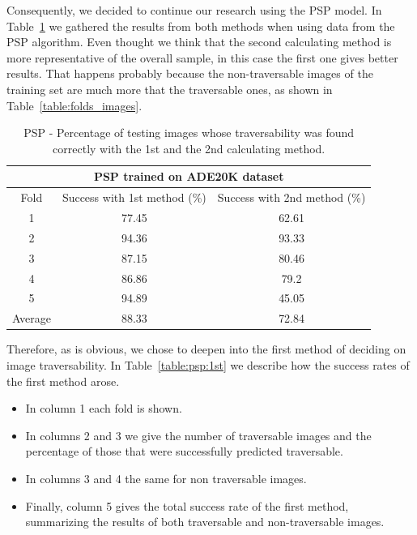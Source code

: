 \documentclass[12pt,a4paper,table,dvipsnames,tikz]{report}
\newcommand{\acronym}{\MakeUppercase}
\newcommand{\bl}[1]{{\hypersetup{linkcolor=blue}#1}}
\begin{document}
	Consequently, we decided to continue our research using the \acronym{psp} model. 
	In Table~\bl{\ref{table:psp}} we gathered the results from both methods when using data 
	from the \acronym{psp} algorithm. Even thought we think that the second calculating 
	method is more representative of the overall sample, in this case the first one gives 
	better results. That happens probably because the non-traversable images of the 
	training set are much more that the traversable ones, as shown in 
	Table~\bl{\ref{table:folds_images}}.
	\\
	
	\begin{table}[h!]
		\caption{\acronym{psp} - Percentage of testing images whose	traversability 
			was found correctly with the 1st and the 2nd calculating method.}
		\centering
		\begin{tabular}{|c|c|c|}
			\hline
			\multicolumn{3}{|c|}{\acronym{psp} trained on \acronym{ade20k} dataset}\\
			\hline
			Fold & Success with 1st method (\%) & Success with 2nd method (\%)\\ 
			\hline\hline
			1 & 77.45 & 62.61\\
			\hline
			2 & 94.36 & 93.33\\
			\hline
			3 & 87.15 & 80.46\\
			\hline
			4 & 86.86 & 79.2\\
			\hline
			5 & 94.89 & 45.05\\
			\hline\hline
			Average & 88.33 & 72.84\\
			\hline
		\end{tabular}
		\label{table:psp}
	\end{table}
	
	Therefore, as is obvious, we chose to deepen into the first method of deciding on 
	image traversability. In Table~\bl{\ref{table:psp:1st}} we describe how the success 
	rates of the first method arose. 
	\begin{itemize}
		\item In column 1 each fold is shown.
		\item In columns 2 and 3 we give the number of traversable images and the 
		percentage of those that were successfully predicted traversable.
		\item In columns 3 and 4 the same for non traversable images.
		\item Finally, column 5 gives the total success rate of the first method, 
		summarizing the results of both traversable and non-traversable images.
	\end{itemize}
	
\end{document}
